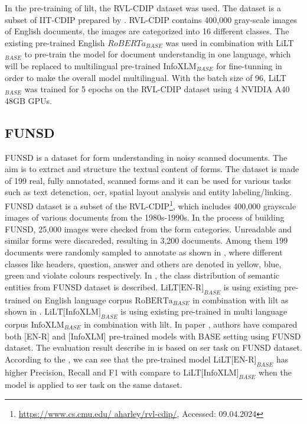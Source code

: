 In the pre-training of \acrshort{lilt}, the RVL-CDIP \cite{lewis2006building} dataset was used. The dataset is a subset of IIT-CDIP prepared by \cite{harley2015evaluation}. RVL-CDIP contains 400,000 gray-scale images of English documents, the images are categorized into 16 different classes. The existing pre-trained English \(RoBERTa_{BASE}\) \cite{liu2019roberta} was used in combination with LiLT\(_{BASE}\) to pre-train the model for document understandig in one language, which will be replaced to multilingual pre-trained InfoXLM\(_{BASE}\) \cite{chi2020infoxlm} for fine-tunning in order to make the overall model multilingual.  With the batch size of 96, LiLT\(_{BASE}\) was trained for 5 epochs on the RVL-CDIP dataset using 4 NVIDIA A40 48GB GPUs.



\subsection{FUNSD}

FUNSD \cite{jaume2019funsd} is a dataset for form understanding in noisy scanned documents. The aim is to extract and structure the textual content of forms. The dataset is made of 199 real, fully annotated, scanned forms and it can be used for various tasks such as text detenction, \acrlong{ocr}, spatial layout analysis and entity labeling/linking. FUNSD dataset is a subset of the RVL-CDIP\footnote{\url{https://www.cs.cmu.edu/ aharley/rvl-cdip/}, Accessed: 09.04.2024}, which includes 400,000 grayscale images of various documents from the 1980s-1990s. In the process of building FUNSD, 25,000 images were checked from the form categories. Unreadable and similar forms were discareded, resulting in 3,200 documents. Among them 199 documents were randomly sampled to annotate as shown in , where different classes like headers, question, answer and others are denoted in yellow, blue, green and violate colours respectively. In , the class distribution of semantic entities from FUNSD dataset is described. LiLT\(\text{[EN-R]}_{BASE}\) is using existing pre-trained on English language corpus \(\text{RoBERTa}_{BASE}\) \cite{liu2019roberta} in combination with \acrshort{lilt} as shown in . \(\text{LiLT[InfoXLM]}_{BASE}\) is using existing pre-trained in multi language corpus  \(\text{InfoXLM}_{BASE}\) \cite{chi2020infoxlm} in combination with \acrshort{lilt}. In paper \cite{wang-etal-2022-lilt}, authors have compared both [EN-R] and [InfoXLM] pre-trained models with BASE setting using FUNSD \cite{jaume2019funsd} dataset. The evaluation result describe in  is based on \acrfull{ser} task on FUNSD dataset. According to the , we can see that the pre-trained model LiLT\(\text{[EN-R]}_{BASE}\) has higher Precision, Recall and F1 with compare to LiLT\(\text{[InfoXLM]}_{BASE}\) when the model is applied to \acrshort{ser} task on the same dataset.

